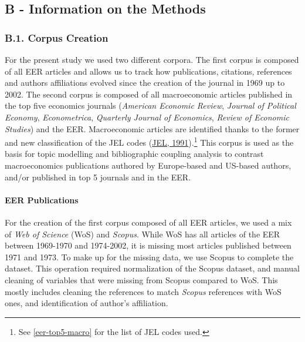 \documentclass[
]{article}
\begin{document}
\newpage

\hypertarget{appendix}{%
\subsection*{B - Information on the Methods}\label{appendix}}

\hypertarget{corpus}{%
\subsubsection*{B.1. Corpus Creation}\label{corpus}}

For the present study we used two different corpora. The first corpus is
composed of all EER articles and allows us to track how publications,
citations, references and authors affiliations evolved since the
creation of the journal in 1969 up to 2002. The second corpus is
composed of all macroeconomic articles published in the top five
economics journals (\emph{American Economic Review}, \emph{Journal of
Political Economy}, \emph{Econometrica}, \emph{Quarterly Journal of
Economics}, \emph{Review of Economic Studies}) and the EER.
Macroeconomic articles are identified thanks to the former and new
classification of the JEL codes (\protect\hyperlink{ref-jel1991}{JEL,
1991}).\footnote{See \ref{eer-top5-macro} for the list of JEL codes
  used.} This corpus is used as the basis for topic modelling and
bibliographic coupling analysis to contrast macroeconomics publications
authored by Europe-based and US-based authors, and/or published in top 5
journals and in the EER.

\hypertarget{eer-publications}{%
\paragraph*{EER Publications}\label{eer-publications}}

For the creation of the first corpus composed of all EER articles, we
used a mix of \emph{Web of Science} (WoS) and \emph{Scopus}. While WoS
has all articles of the EER between 1969-1970 and 1974-2002, it is
missing most articles published between 1971 and 1973. To make up for
the missing data, we use Scopus to complete the dataset. This operation
required normalization of the Scopus dataset, and manual cleaning of
variables that were missing from Scopus compared to WoS. This mostly
includes cleaning the references to match \emph{Scopus} references with
WoS ones, and identification of author's affiliation.
\end{document}
